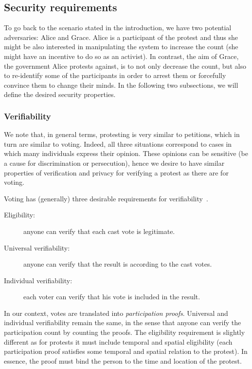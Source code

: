 \subsection{Security requirements}%
\label{security-properties}

To go back to the scenario stated in the introduction, we have two potential 
adversaries: Alice and Grace.
Alice is a participant of the protest and thus she might be also interested in manipulating the system to increase the count (\eg she might have an incentive to do so as an activist).
In contrast, the aim of Grace, the government Alice protests against, is to not only decrease the count, but also to re-identify some of the participants in order to arrest them or forcefully convince them to change their minds.
In the following two subsections, we will define the desired security properties.

\subsubsection{Verifiability}%
\label{Verifiability}

We note that, in general terms, protesting is very similar to petitions, which in turn are similar to voting.
Indeed, all three situations correspond to cases in which many individuals express their opinion.
These opinions can be sensitive (\eg be a cause for discrimination or persecution), hence we desire to have similar properties of verification and privacy for verifying a protest as there are for voting.

Voting has (generally) three desirable requirements for verifiability~\cite{VerifyingPrivacyPropertiesOfVotingProtocols}.
\begin{description}
  \item[Eligibility:] anyone can verify that each cast vote is legitimate.
  \item[Universal verifiability:] anyone can verify that the result is according to the cast votes.
  \item[Individual verifiability:] each voter can verify that his vote is included in the result.
\end{description}
In our context, votes are translated into \emph{participation proofs}.
Universal and individual verifiability remain the same, in the sense that anyone can verify the participation count by counting the proofs.
The eligibility requirement is slightly different as for protests it must include temporal and spatial eligibility (\ie each participation proof satisfies some temporal and spatial relation to the protest).
In essence, the proof must bind the person to the time and location of the protest.

